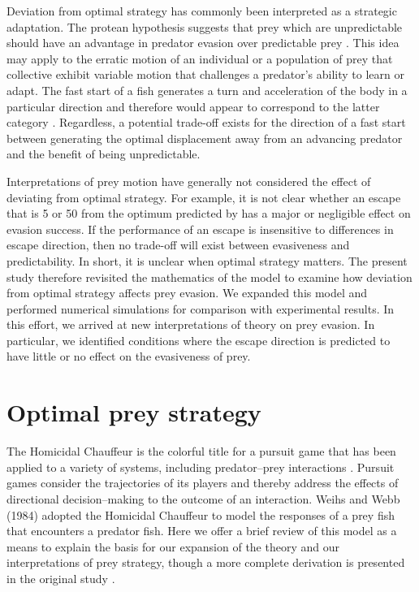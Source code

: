 \documentclass[12pt]{article}
\begin{document}
Deviation from optimal strategy has commonly been interpreted as a strategic adaptation. The protean hypothesis suggests that prey which are unpredictable should have an advantage in predator evasion over predictable prey \citep{Humphries:1970hy}. 
This idea may apply to the erratic motion of an individual or a population of prey that collective exhibit variable motion that challenges a predator's ability to learn or adapt. The fast start of a fish generates a turn and acceleration of the body in a particular direction and therefore would appear to correspond to the latter category \citep{D:1973up}. 
Regardless, a potential trade-off exists for the direction of a fast start between generating the optimal displacement away from an advancing predator and the benefit of being unpredictable.  

Interpretations of prey motion have generally not considered the effect of deviating from optimal strategy. For example, it is not clear whether an escape that is 5\textdegree\hspace{0.5pt} or 50\textdegree\hspace{0.5pt} from the optimum predicted by \cite{Weihs:1984tb} has a major or negligible effect on evasion success. 
If the performance of an escape is insensitive to differences in escape direction, then no trade-off will exist between evasiveness and predictability. In short, it is unclear when optimal strategy matters. 
The present study therefore revisited the mathematics of the \cite{Weihs:1984tb} model to examine how deviation from optimal strategy affects prey evasion. We expanded this model and performed numerical simulations for comparison with experimental results. In this effort, we arrived at new interpretations of theory on prey evasion. In particular, we identified conditions where the escape direction is predicted to have little or no effect on the evasiveness of prey.

\section{Optimal prey strategy}
\label{opt_strategy}

The Homicidal Chauffeur is the colorful title for a pursuit game that has been applied to a variety of systems, including predator--prey interactions \citep{Isaacs:1965va}. Pursuit games consider the trajectories of its players and thereby address the effects of directional decision--making to the outcome of an interaction. 
Weihs and Webb (1984) adopted the Homicidal Chauffeur to model the responses of a prey fish that encounters a predator fish. Here we offer a brief review of this model as a means to explain the basis for our expansion of the theory and our interpretations of prey strategy, though a more complete derivation is presented in the original study \citep{Weihs:1984tb}.
\end{document}

